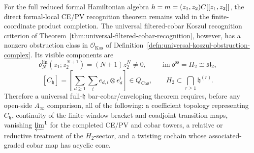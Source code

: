 \begin{cor}
\label{cor:full-maximal-ideal-universal-obstruction-class}
  For the full reduced formal Hamiltonian algebra
  \(h=m=(z_1,z_2)C[[z_1,z_2]]\), the direct
  formal-local CE/PV recognition theorem remains valid in the
  finite-coordinate product completion.  The universal filtered-cobar
  Koszul recognition criterion of
  Theorem~\ref{thm:universal-filtered-cobar-recognition}, however, has
  a nonzero obstruction class in
  \(\mathcal O_{\mathrm{Kos}}\) of
  Definition~\ref{defn:universal-koszul-obstruction-complex}.  Its
  visible components are
  \[
    \mathfrak o^{\mathrm{lin}}_N(z_1;z_2^{N+1})
      =(N+1)z_2^N\neq0,
    \qquad
    \operatorname{im}\mathfrak o^{\mathrm{ss}}=H_2\cong\mathfrak{sl}_2,
  \]
  \[
    [C_{\mathfrak h}]
      =
      \left[
        \sum_{d\geq1}\sum_i e_{d,i}\otimes e_d^i
      \right]
      \in Q_{\mathrm{Cas}},
    \qquad
    H_2\subset\bigcap_{r\geq1}\mathfrak h^{(r)} .
  \]
  Therefore a universal full-\(\mathfrak h\)
  bar-cobar/enveloping theorem requires,
  before any open-side \(A_\infty\) comparison, all of the following:
  a coefficient topology representing \(C_{\mathfrak h}\), continuity of
  the finite-window bracket and coadjoint transition maps, vanishing
  \(\varprojlim^1\) for the completed CE/PV and cobar towers, a
  relative or reductive treatment of the
  \(H_2\)-sector, and a twisting cochain whose associated-graded cobar
  map has acyclic cone.
\end{cor}

